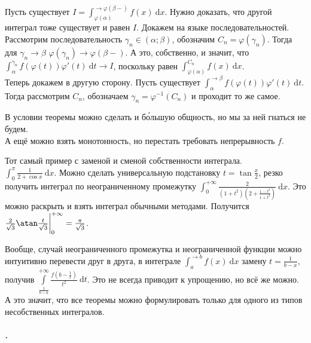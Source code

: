 \documentclass{article}
\begin{document}
\begin{itemize}
\begin{Proof}
            Пусть существует $I=\int_{\varphi(\alpha)}^{\to\varphi(\beta-)}f(x)~\mathrm dx$. Нужно доказать, что другой интеграл тоже существует и равен $I$. Докажем на языке последовательностей. Рассмотрим последовательность $\gamma_n\in(\alpha;\beta)$, обозначим $C_n=\varphi(\gamma_n)$. Тогда для $\gamma_n\to\beta$ $\varphi(\gamma_n)\to\varphi(\beta-)$. А это, собственно, и значит, что $\int_\alpha^{\gamma_n}f(\varphi(t))\varphi'(t)~\mathrm dt\to I$, поскольку равен $\int_{\varphi(\alpha)}^{C_n}f(x)~\mathrm dx$.\\
            Теперь докажем в другую сторону. Пусть существует $\int_\alpha^{\to\beta}f(\varphi(t))\varphi'(t)~\mathrm dt$. Тогда рассмотрим $C_n$, обозначаем $\gamma_n=\varphi^{-1}(C_n)$ и проходит то же самое.
        \end{Proof}
        \begin{Comment}
            В условии теоремы можно сделать и б\'{о}льшую общность, но мы за ней гнаться не будем.\\
            А ещё можно взять монотонность, но перестать требовать непрерывность $f$.
        \end{Comment}
        \begin{Example}
            Тот самый пример с заменой и сменой собственности интеграла.\\
            $\int_0^\pi\frac1{2+\cos x}~\mathrm dx$. Можно сделать универсальную подстановку $t=\tan\frac x2$, резко получить интеграл по неограниченному промежутку $\int_0^{+\infty}\frac2{(1+t^2)(2+\frac{1-t^2}{1+t^2})}~\mathrm dx$. Это можно раскрыть и взять интеграл обычными методами. Получится $\frac2{\sqrt3}\atan\frac t{\sqrt3}\bigg|_0^{+\infty}=\frac\pi{\sqrt3}$.
        \end{Example}
        \begin{Comment}
            Вообще, случай неограниченного промежутка и неограниченной функции можно интуитивно перевести друг в друга, в интеграле $\int_a^{\to b}f(x)~\mathrm dx$ замену $t=\frac1{b-x}$, получив $\int\limits_{\frac1{b-a}}^{+\infty}\frac{f(b-\frac1t)}{t^2}~\mathrm dt$. Это не всегда приводит к упрощению, но всё же можно. А это значит, что все теоремы можно формулировать только для одного из типов несобственных интегралов.
        \end{Comment}
    \end{itemize}
    \subparagraph{.}
\end{document}
